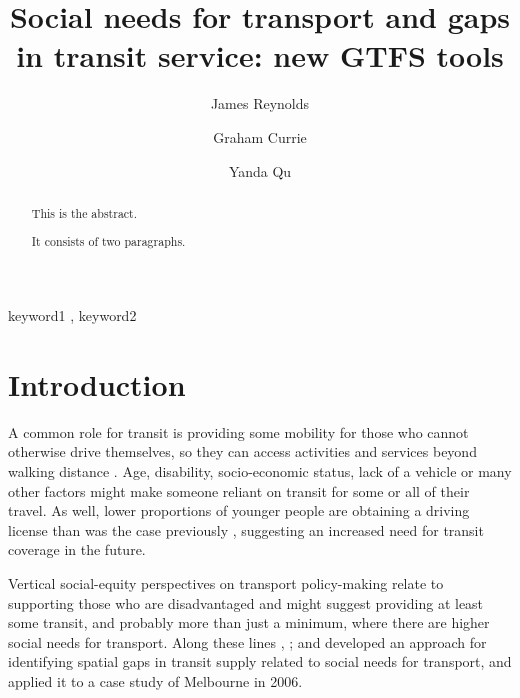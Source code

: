 \documentclass[preprint, 3p,
authoryear]{elsarticle} %
\begin{document}
\begin{frontmatter}

  \title{Social needs for transport and gaps in transit service: new
GTFS tools}
    \author[Public Transport Research Group (PTRG)]{James Reynolds%
  }
    \author[Public Transport Research Group (PTRG)]{Graham Currie%
  }
    \author[Public Transport Research Group (PTRG)]{Yanda Qu%
  }
  
  \begin{abstract}
  This is the abstract.

  It consists of two paragraphs.
  \end{abstract}
    \begin{keyword}
    keyword1 \sep 
    keyword2
  \end{keyword}
  
 \end{frontmatter}

\section{Introduction}\label{introduction}

A common role for transit is providing some mobility for those who
cannot otherwise drive themselves, so they can access activities and
services beyond walking distance \citep{Currie:2016aa}. Age, disability,
socio-economic status, lack of a vehicle or many other factors might
make someone reliant on transit for some or all of their travel. As
well, lower proportions of younger people are obtaining a driving
license than was the case previously \citep{delbosc2013causes},
suggesting an increased need for transit coverage in the future.

Vertical social-equity perspectives on transport policy-making relate to
supporting those who are disadvantaged \citep{Litman:2016aa} and might
suggest providing at least some transit, and probably more than just a
minimum, where there are higher social needs for transport. Along these
lines \citet{Currie2003Hobart}, \citet{Currie2004Gap};
\citet{Currie2007Identifying} and \citet{currie2010identifying}
developed an approach for identifying spatial gaps in transit supply
related to social needs for transport, and applied it to a case study of
Melbourne in 2006.
\end{document}
